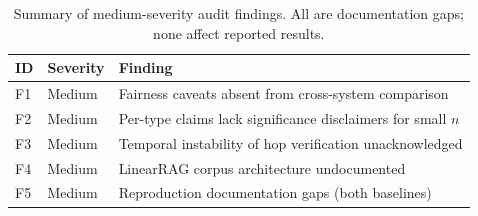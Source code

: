 \begin{table}[h]
\centering
\begin{tabular}{llp{7cm}}
\toprule
\textbf{ID} & \textbf{Severity} & \textbf{Finding} \\
\midrule
F1 & Medium & Fairness caveats absent from cross-system comparison \\
F2 & Medium & Per-type claims lack significance disclaimers for small $n$ \\
F3 & Medium & Temporal instability of hop verification unacknowledged \\
F4 & Medium & LinearRAG corpus architecture undocumented \\
F5 & Medium & Reproduction documentation gaps (both baselines) \\
\bottomrule
\end{tabular}
\caption{Summary of medium-severity audit findings. All are documentation gaps; none affect reported results.}
\label{tab:audit-findings}
\end{table}
